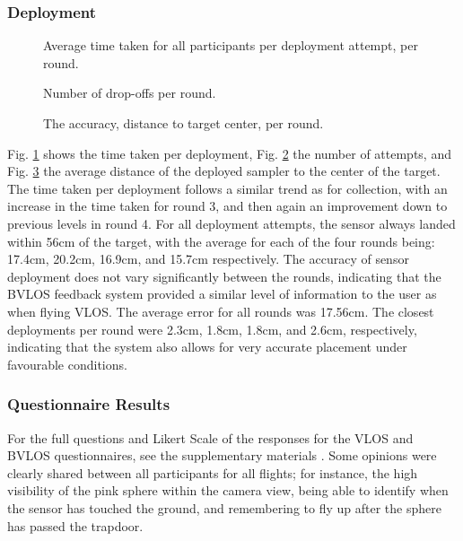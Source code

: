 
\subsubsection{Deployment}

\begin{figure}[!t]
\centering

\vspace{-0.6em}
\caption{Average time taken for all participants per deployment attempt, per round.}
\label{fig:fig5-deployment-time-boxplot}
\end{figure}

\begin{figure}[!t]
\centering

\vspace{-0.6em}
\caption{ Number of drop-offs per round.}
\label{fig:fig5-deployment-number-boxplot}
\end{figure}

\begin{figure}[!t]
\centering

\vspace{-0.6em}
\caption{The accuracy, distance to target center, per round.}
\label{fig:fig5-deployment-accuracy-boxplot}
\end{figure}

Fig. \ref{fig:fig5-deployment-time-boxplot} shows the time taken per deployment, Fig. \ref{fig:fig5-deployment-number-boxplot} the number of attempts, and Fig. \ref{fig:fig5-deployment-accuracy-boxplot} the average distance of the deployed sampler to the center of the target. The time taken per deployment follows a similar trend as for collection, with an increase in the time taken for round 3, and then again an improvement down to previous levels in round 4. For all deployment attempts, the sensor always landed within 56cm of the target, with the average for each of the four rounds being: 17.4cm, 20.2cm, 16.9cm, and 15.7cm respectively.
The accuracy of sensor deployment does not vary significantly between the rounds, indicating that the \ac{BVLOS} feedback system provided a similar level of information to the user as when flying \ac{VLOS}. The average error for all rounds was 17.56cm. The closest deployments per round were 2.3cm, 1.8cm, 1.8cm, and 2.6cm, respectively, indicating that the system also allows for very accurate placement under favourable conditions.

\subsubsection{Questionnaire Results}
For the full questions and Likert Scale of the responses for the VLOS and BVLOS questionnaires, see the supplementary materials \cite{Geckeler}.
Some opinions were clearly shared between all participants for all flights; for instance, the high visibility of the pink sphere within the camera view, being able to identify when the sensor has touched the ground, and remembering to fly up after the sphere has passed the trapdoor. 

